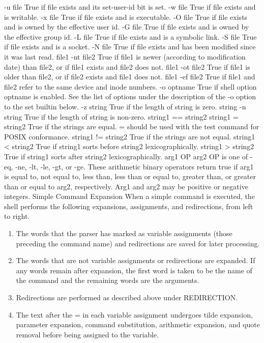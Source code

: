 -u file
True if file exists and its set-user-id bit is set.
-w file
True if file exists and is writable.
-x file
True if file exists and is executable.
-O file
True if file exists and is owned by the effective user id.
-G file
True if file exists and is owned by the effective group id.
-L file
True if file exists and is a symbolic link.
-S file
True if file exists and is a socket.
-N file
True if file exists and has been modified since it was last read.
file1 -nt file2
True if file1 is newer (according to modification date) than file2, or if file1 exists and file2 does not.
file1 -ot file2
True if file1 is older than file2, or if file2 exists and file1 does not.
file1 -ef file2
True if file1 and file2 refer to the same device and inode numbers.
-o optname
True if shell option optname is enabled. See the list of options under the description of the -o option to the set builtin below.
-z string
True if the length of string is zero.
string
-n string
True if the length of string is non-zero.
string1 == string2
string1 = string2
True if the strings are equal. = should be used with the test command for POSIX conformance.
string1 != string2
True if the strings are not equal.
string1 < string2
True if string1 sorts before string2 lexicographically.
string1 > string2
True if string1 sorts after string2 lexicographically.
arg1 OP arg2
OP is one of -eq, -ne, -lt, -le, -gt, or -ge. These arithmetic binary operators return true if arg1 is equal to, not equal to, less than, less than or equal to, greater than, or greater than or equal to arg2, respectively. Arg1 and arg2 may be positive or negative integers.
Simple Command Expansion
When a simple command is executed, the shell performs the following expansions, assignments, and redirections, from left to right.

\begin{enumerate}
\item  The words that the parser has marked as variable assignments (those preceding the command name) and redirections are saved for later processing.

\item  The words that are not variable assignments or redirections are expanded. If any words remain after expansion, the first word is taken to be the name of the command and the remaining words are the arguments.

\item  Redirections are performed as described above under REDIRECTION.

\item  The text after the = in each variable assignment undergoes tilde expansion, parameter expansion, command substitution, arithmetic expansion, and quote removal before being assigned to the variable.
\end{enumerate}

